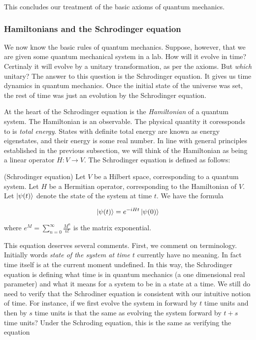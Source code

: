 This concludes our treatment of the basic axioms of quantum mechanics.

\subsubsection{Hamiltonians and the Schrodinger equation}

We now know the basic rules of quantum mechanics. Suppose, however, that we are given some quantum mechanical system in a lab. How will it evolve in time? Certinaly it will evolve by a unitary transformation, as per the axioms. But \textit{which} unitary? The answer to this question is the Schrodinger equation. It gives us time dynamics in quantum mechanics. Once the initial state of the universe was set, the rest of time was just an evolution by the Schrodinger equation. 

At the heart of the Schrodinger equation is the \textit{Hamiltonian} of a quantum system. The Hamiltonian is an observable. The physical quantity it coressponds to is \textit{total energy}. States with definite total energy are known as energy eigenstates, and their energy is some real number. In line with general principles established in the previous subsection, we will think of the Hamiltonian as being a linear operator $H:V\to V$. The Schrodinger equation is defined as follows:

\begin{definition} (Schrodinger equation) Let $V$ be a Hilbert space, corresponding to a quantum system. Let $H$ be a Hermitian operator, corresponding to the Hamiltonian of $V$. Let $\ket{\psi(t)}$ denote the state of the system at time $t$. We have the formula

$$\ket{\psi(t)}=e^{-i H t}\ket{\psi(0)}$$

where $e^M=\sum_{n=0}^{\infty}\frac{M^n}{n!}$ is the matrix exponential.

\raggedleft\qedsymbol{}
\end{definition}

This equation deserves several comments. First, we comment on terminology. Initially words \textit{state of the system at time $t$} currently have no meaning. In fact time itself is at the current moment undefined. In this way, the Schrodinger equation is defining what time is in quantum mechanics (a one dimensional real parameter) and what it means for a system to be in a state at a time. We still do need to verify that the Schrodiner equation is consistent with our intuitive notion of time. For instance, if we first evolve the system in forward by $t$ time units and then by $s$ time units is that the same as evolving the system forward by $t+s$ time units? Under the Schroding equation, this is the same as verifying the equation

